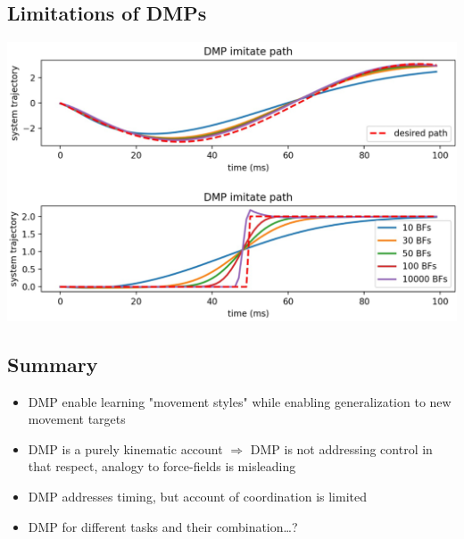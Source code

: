 \documentclass[10pt]{article}
\begin{document}
\subsection*{Limitations of DMPs}
\begin{center} 
	\includegraphics*[width=\textwidth]{L1_14.png} 
\end{center}

\subsection*{Summary}
\begin{itemize}
	\item DMP enable learning "movement styles" while enabling generalization to new movement targets
	\item DMP is a purely kinematic account $\Rightarrow$ DMP is not addressing control in that respect, analogy to force-fields is misleading
	\item DMP addresses timing, but account of coordination is limited
	\item DMP for different tasks and their combination\dots?
\end{itemize}
\end{document}
